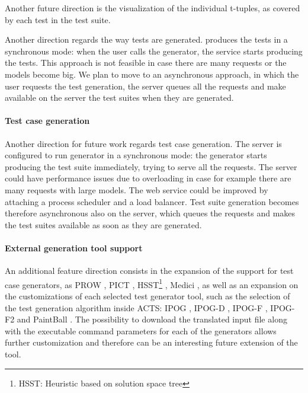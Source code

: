 \begin{tikzborder}{\cite{Gargantini16:validation}}
\begin{tikzborder}{\cite{gargantini_combinatorial_2017}}
\begin{tikzborder}{\cite{gargantini_combinatorial_2017}}
\begin{tikzborder}{\cite{garn2019}}
\begin{tikzborder}{\cite{arcaini2019achieving}}
\begin{tikzborder}{}
Another future direction is the visualization of the individual t-tuples, as covered by each test in the test suite.
\end{tikzborder}

Another direction regards the way tests are generated. \ctwedge produces the tests in a synchronous mode: when the user calls the generator, the service starts producing the tests. This approach is not feasible in case there are many requests or the models become big. We plan to move to an asynchronous approach, in which the user requests the test generation, the server queues all the requests and make available on the server the test suites when they are generated. 

\paragraph{Test case generation}
\begin{tikzborder}{\cite{IWCTGargantini2018}}
Another direction for future work regards test case generation. The server is configured to run \ctwedge generator in a synchronous mode: the generator starts producing the test suite immediately, trying to serve all the requests.
The server could have performance issues due to overloading in case for example there are many requests with large models. The web service could be improved by attaching a process scheduler and a load balancer. Test suite generation becomes therefore asynchronous also on the server, which queues the requests and makes the test suites available as soon as they are generated.

\paragraph{External generation tool support}
An additional feature direction consists in the expansion of the support for test case generators, as PROW \cite{2015:PROW}, PICT \cite{pictmaster}, HSST\footnote{HSST: Heuristic based on solution space tree} \cite{Nie2006}, Medici \cite{hvc14}, as well as an expansion on the customizations of each selected test generator tool, such as the selection of the test generation algorithm inside ACTS: IPOG
\cite{ipog}, IPOG-D \cite{ipog}, IPOG-F \cite{forbes2008refining}, IPOG-F2 \cite{forbes2008refining} and PaintBall \cite{318466}. 
The possibility to download the translated input file along with the executable command parameters for each of the generators allows further customization and therefore can be an interesting future extension of the tool.


\end{tikzborder}
\end{tikzborder}
\end{tikzborder}
\end{tikzborder}
\end{tikzborder}
\end{tikzborder}
